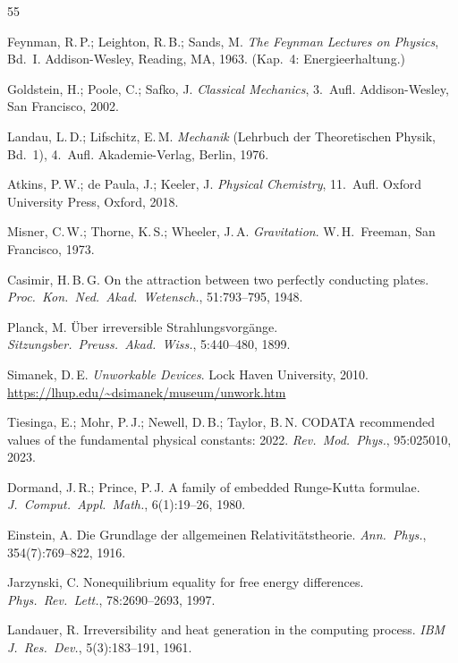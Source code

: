 ﻿\documentclass[12pt, a4paper]{report}
\theoremstyle{definition}
\theoremstyle{remark}
\begin{document}
\begin{thebibliography}{55}
\raggedright

  Feynman, R.\,P.; Leighton, R.\,B.; Sands, M.
  \textit{The Feynman Lectures on Physics}, Bd.~I.
  Addison-Wesley, Reading, MA, 1963.
  (Kap.~4: Energieerhaltung.)

  Goldstein, H.; Poole, C.; Safko, J.
  \textit{Classical Mechanics}, 3.~Aufl.
  Addison-Wesley, San Francisco, 2002.

  Landau, L.\,D.; Lifschitz, E.\,M.
  \textit{Mechanik} (Lehrbuch der Theoretischen Physik, Bd.~1), 4.~Aufl.
  Akademie-Verlag, Berlin, 1976.

  Atkins, P.\,W.; de Paula, J.; Keeler, J.
  \textit{Physical Chemistry}, 11.~Aufl.
  Oxford University Press, Oxford, 2018.

  Misner, C.\,W.; Thorne, K.\,S.; Wheeler, J.\,A.
  \textit{Gravitation}.
  W.\,H.\ Freeman, San Francisco, 1973.

  Casimir, H.\,B.\,G.
  On the attraction between two perfectly conducting plates.
  \textit{Proc.\ Kon.\ Ned.\ Akad.\ Wetensch.}, 51:793--795, 1948.

  Planck, M.
  Über irreversible Strahlungsvorgänge.
  \textit{Sitzungsber.\ Preuss.\ Akad.\ Wiss.}, 5:440--480, 1899.

  Simanek, D.\,E.
  \textit{Unworkable Devices}.
  Lock Haven University, 2010.
  {\small\url{https://lhup.edu/~dsimanek/museum/unwork.htm}}

  Tiesinga, E.; Mohr, P.\,J.; Newell, D.\,B.; Taylor, B.\,N.
  CODATA recommended values of the fundamental physical constants: 2022.
  \textit{Rev.\ Mod.\ Phys.}, 95:025010, 2023.

  Dormand, J.\,R.; Prince, P.\,J.
  A family of embedded Runge-Kutta formulae.
  \textit{J.\ Comput.\ Appl.\ Math.}, 6(1):19--26, 1980.

  Einstein, A.
  Die Grundlage der allgemeinen Relativitätstheorie.
  \textit{Ann.\ Phys.}, 354(7):769--822, 1916.

  Jarzynski, C.
  Nonequilibrium equality for free energy differences.
  \textit{Phys.\ Rev.\ Lett.}, 78:2690--2693, 1997.

  Landauer, R.
  Irreversibility and heat generation in the computing process.
  \textit{IBM J.\ Res.\ Dev.}, 5(3):183--191, 1961.


\end{thebibliography}
\end{document}
